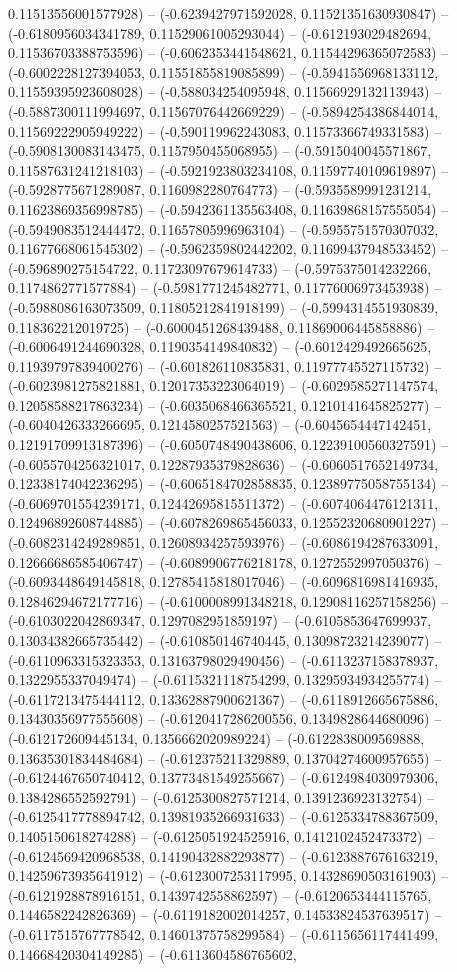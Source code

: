 0.11513556001577928) -- (-0.6239427971592028, 0.11521351630930847) -- (-0.6180956034341789, 0.11529061005293044) -- (-0.612193029482694, 0.11536703388753596) -- (-0.6062353441548621, 0.11544296365072583) -- (-0.6002228127394053, 0.11551855819085899) -- (-0.5941556968133112, 0.11559395923608028) -- (-0.588034254095948, 0.11566929132113943) -- (-0.5887300111994697, 0.11567076442669229) -- (-0.5894254386844014, 0.11569222905949222) -- (-0.590119962243083, 0.11573366749331583) -- (-0.5908130083143475, 0.1157950455068955) -- (-0.5915040045571867, 0.11587631241218103) -- (-0.5921923803234108, 0.11597740109619897) -- (-0.5928775671289087, 0.1160982280764773) -- (-0.5935589991231214, 0.11623869356998785) -- (-0.5942361135563408, 0.11639868157555054) -- (-0.5949083512444472, 0.11657805996963104) -- (-0.5955751570307032, 0.11677668061545302) -- (-0.5962359802442202, 0.11699437948533452) -- (-0.596890275154722, 0.11723097679614733) -- (-0.5975375014232266, 0.1174862771577884) -- (-0.5981771245482771, 0.11776006973453938) -- (-0.5988086163073509, 0.11805212841918199) -- (-0.5994314551930839, 0.118362212019725) -- (-0.6000451268439488, 0.11869006445858886) -- (-0.6006491244690328, 0.1190354149840832) -- (-0.6012429492665625, 0.11939797839400276) -- (-0.601826110835831, 0.11977745527115732) -- (-0.6023981275821881, 0.12017353223064019) -- (-0.6029585271147574, 0.12058588217863234) -- (-0.6035068466365521, 0.1210141645825277) -- (-0.6040426333266695, 0.1214580257521563) -- (-0.6045654447142451, 0.12191709913187396) -- (-0.6050748490438606, 0.12239100560327591) -- (-0.6055704256321017, 0.12287935379828636) -- (-0.6060517652149734, 0.12338174042236295) -- (-0.6065184702858835, 0.12389775058755134) -- (-0.6069701554239171, 0.12442695815511372) -- (-0.6074064476121311, 0.12496892608744885) -- (-0.6078269865456033, 0.12552320680901227) -- (-0.6082314249289851, 0.12608934257593976) -- (-0.6086194287633091, 0.12666686585406747) -- (-0.6089906776218178, 0.1272552997050376) -- (-0.6093448649145818, 0.12785415818017046) -- (-0.6096816981416935, 0.12846294672177716) -- (-0.6100008991348218, 0.12908116257158256) -- (-0.6103022042869347, 0.1297082951859197) -- (-0.6105853647699937, 0.13034382665735442) -- (-0.610850146740445, 0.13098723214239077) -- (-0.6110963315323353, 0.13163798029490456) -- (-0.6113237158378937, 0.1322955337049474) -- (-0.6115321118754299, 0.13295934934255774) -- (-0.6117213475444112, 0.13362887900621367) -- (-0.6118912665675886, 0.13430356977555608) -- (-0.6120417286200556, 0.1349828644680096) -- (-0.612172609445134, 0.1356662020989224) -- (-0.6122838009569888, 0.13635301834484684) -- (-0.612375211329889, 0.13704274600957655) -- (-0.6124467650740412, 0.13773481549255667) -- (-0.6124984030979306, 0.1384286552592791) -- (-0.6125300827571214, 0.1391236923132754) -- (-0.6125417778894742, 0.13981935266931633) -- (-0.6125334788367509, 0.1405150618274288) -- (-0.6125051924525916, 0.1412102452473372) -- (-0.6124569420968538, 0.14190432882293877) -- (-0.6123887676163219, 0.14259673935641912) -- (-0.6123007253117995, 0.14328690503161903) -- (-0.6121928878916151, 0.1439742558862597) -- (-0.6120653444115765, 0.1446582242826369) -- (-0.6119182002014257, 0.14533824537639517) -- (-0.6117515767778542, 0.14601375758299584) -- (-0.6115656117441499, 0.14668420304149285) -- (-0.6113604586765602, 
